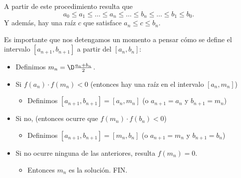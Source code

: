 
A partir de este procedimiento resulta que
\[
a_0 \le a_1 \le \dots \le a_n \le \dots \le b_n \le \dots\le b_1 \le b_0.
\]
Y además, hay una raíz $c$ que satisface $a_n \le c \le b_n$.

Es importante que nos detengamos un momento a pensar cómo se define el intervalo $[a_{n+1},b_{n+1}]$ a partir del $[a_n,b_n]$:
\begin{itemize}
\item Definimos $m_n = \D\frac{a_n+b_n}2$.
\item Si $f(a_n)\cdot f(m_n) < 0$ (entonces hay una raíz en el intervalo $[a_n,m_n] $)
\begin{itemize}
\item Definimos $[a_{n+1},b_{n+1}] = [a_n,m_n]$ (o $a_{n+1} = a_n$ y $b_{n+1} = m_n$)
\end{itemize}
\item Si no, (entonces ocurre que $f(m_n)\cdot f(b_n) < 0$)
\begin{itemize}
\item Definimos $[a_{n+1},b_{n+1}] = [m_n,b_n]$ (o $a_{n+1} = m_n$ y $b_{n+1} = b_n$)
\end{itemize}
\item Si no ocurre ninguna de las anteriores, resulta $f(m_n)=0$. 
\begin{itemize}
\item Entonces $m_n$ es la solución. FIN.
\end{itemize}
\end{itemize}

